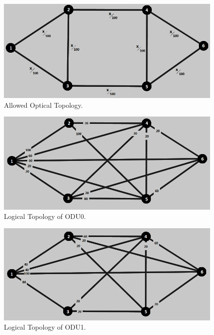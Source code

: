 \begin{figure}[H]
\centering
\includegraphics[width=13cm]{sdf/heuristic/figures/topologies/opaque_protec/high/allowed_optical_high}
\caption{Allowed Optical Topology.}
\label{allowed_optical_surv_ref_high_heuristic}
\end{figure}

\begin{figure}[H]
\centering
\includegraphics[width=13cm]{sdf/heuristic/figures/topologies/opaque_protec/high/logical_topology_odu0_high}
\caption{Logical Topology of ODU0.}
\label{logical_ODU0_surv_ref_high_heuristic}
\end{figure}

\begin{figure}[H]
\centering
\includegraphics[width=13cm]{sdf/heuristic/figures/topologies/opaque_protec/high/logical_topology_odu1_high}
\caption{Logical Topology of ODU1.}
\label{logical_ODU1_surv_ref_high_heuristic}
\end{figure}

